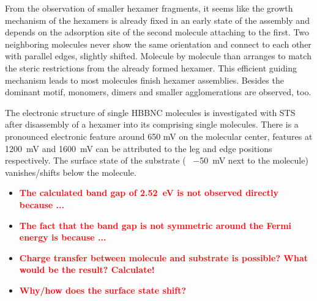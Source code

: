 From the observation of smaller hexamer fragments, it seems like the growth mechanism of the hexamers is already fixed in an early state of the assembly and depends on the adsorption site of the second molecule attaching to the first. Two neighboring molecules never show the same orientation and connect to each other with parallel edges, slightly shifted.
Molecule by molecule than arranges to match the steric restrictions from the already formed hexamer. This efficient guiding mechanism leads to most molecules finish hexamer assemblies. 
Besides the dominant motif, monomers, dimers and smaller agglomerations are observed, too.

The electronic structure of single HBBNC molecules is investigated with STS after disassembly of a hexamer into its comprising single molecules. There is a pronounced electronic feature around 650 mV on the molecular center, features at \SI{1200}{\milli \volt} and \SI{1600}{\milli \volt} can be attributed to the leg and edge positions respectively. The surface state of the substrate (~ \SI{-50}{\milli \volt} next to the molecule) vanishes/shifts below the molecule. 
\begin{itemize}
	\item \textbf{\textcolor{red}{The calculated band gap of \SI{2.52}{\eV} is not observed directly because ...}}
	\item \textbf{\textcolor{red}{The fact that the band gap is not symmetric around the Fermi energy is because ...}}
	\item \textbf{\textcolor{red}{Charge transfer between molecule and substrate is possible? What would be the result? Calculate!}}
	\item \textbf{\textcolor{red}{Why/how does the surface state shift?}}
\end{itemize}

